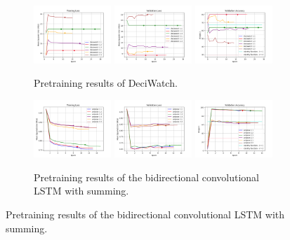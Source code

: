 \documentclass[./main.tex]{subfiles}
\begin{document}
\begin{figure}[htbp]
    \begin{subfigure}[b]{\textwidth}
        \centering
        \includegraphics[width=0.32\textwidth]{./entities/pretrained/deciwatch/train_losses.png}
        \includegraphics[width=0.32\textwidth]{./entities/pretrained/deciwatch/val_losses.png}
        \includegraphics[width=0.32\textwidth]{./entities/pretrained/deciwatch/val_accs.png}
        \caption{Pretraining results of DeciWatch.}
    \end{subfigure}
   \hfill

   \begin{subfigure}[b]{\textwidth}
    \centering
    \includegraphics[width=0.32\textwidth]{./entities/pretrained/unipose/train_losses.png}
    \includegraphics[width=0.32\textwidth]{./entities/pretrained/unipose/val_losses.png}
    \includegraphics[width=0.32\textwidth]{./entities/pretrained/unipose/val_accs.png}
    \caption{Pretraining results of the bidirectional convolutional LSTM with summing.}
    \end{subfigure}
    \hfill


\end{figure}
\end{document}
